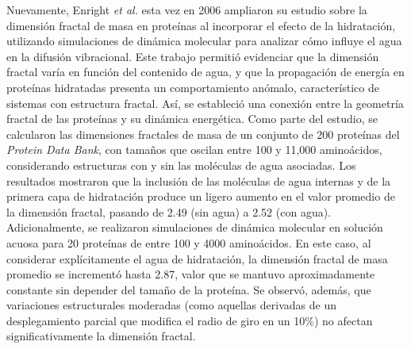  Nuevamente, Enright \textit{et al.}\cite{Enright2006} esta vez en 2006 ampliaron su estudio sobre la dimensi\'{o}n fractal de masa en prote\'{i}nas al incorporar el efecto de la hidrataci\'{o}n, utilizando simulaciones de din\'{a}mica molecular para analizar c\'{o}mo influye el agua en la difusi\'{o}n vibracional. Este trabajo permiti\'{o} evidenciar que la dimensi\'{o}n fractal var\'{i}a en funci\'{o}n del contenido de agua, y que la propagaci\'{o}n de energ\'{i}a en prote\'{i}nas hidratadas presenta un comportamiento an\'{o}malo, caracter\'{i}stico de sistemas con estructura fractal. As\'{i}, se estableci\'{o} una conexi\'{o}n entre la geometr\'{i}a fractal de las prote\'{i}nas y su din\'{a}mica energ\'{e}tica. Como parte del estudio, se calcularon las dimensiones fractales de masa de un conjunto de 200 prote\'{i}nas del \textit{Protein Data Bank}, con tamaños que oscilan entre 100 y 11,000 amino\'{a}cidos, considerando estructuras con y sin las mol\'{e}culas de agua asociadas. Los resultados mostraron que la inclusi\'{o}n de las mol\'{e}culas de agua internas y de la primera capa de hidrataci\'{o}n produce un ligero aumento en el valor promedio de la dimensi\'{o}n fractal, pasando de 2.49 (sin agua) a 2.52 (con agua). Adicionalmente, se realizaron simulaciones de din\'{a}mica molecular en soluci\'{o}n acuosa para 20 prote\'{i}nas de entre 100 y 4000 amino\'{a}cidos. En este caso, al considerar expl\'{i}citamente el agua de hidrataci\'{o}n, la dimensi\'{o}n fractal de masa promedio se increment\'{o} hasta 2.87, valor que se mantuvo aproximadamente constante sin depender del tamaño de la prote\'{i}na. Se observ\'{o}, adem\'{a}s, que variaciones estructurales moderadas (como aquellas derivadas de un desplegamiento parcial que modifica el radio de giro en un 10\%) no afectan significativamente la dimensi\'{o}n fractal.


